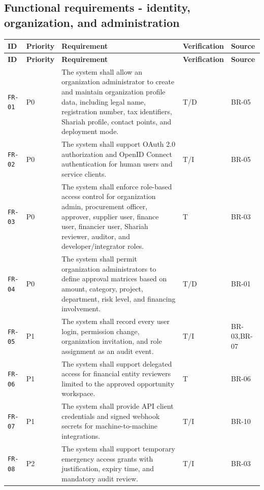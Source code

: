 \documentclass[11pt,a4paper]{article}
\begin{document}
\subsection{Functional requirements - identity, organization, and administration}\label{sec:fr-identity}
\begin{footnotesize}
\begin{longtable}{@{}p{}p{}p{}p{}p{}@{}}
\rowcolor{gray!18}\textbf{ID} & \textbf{Priority} & \textbf{Requirement} & \textbf{Verification} & \textbf{Source} \\ \hline
\endfirsthead
\rowcolor{gray!18}\textbf{ID} & \textbf{Priority} & \textbf{Requirement} & \textbf{Verification} & \textbf{Source} \\ \hline
\endhead
\texttt{FR-01} & P0 & The system shall allow an organization administrator to create and maintain organization profile data, including legal name, registration number, tax identifiers, Shariah profile, contact points, and deployment mode. & T/D & BR-05 \\ \hline
\texttt{FR-02} & P0 & The system shall support OAuth 2.0 authorization and OpenID Connect authentication for human users and service clients. & T/I & BR-05 \\ \hline
\texttt{FR-03} & P0 & The system shall enforce role-based access control for organization admin, procurement officer, approver, supplier user, finance user, financier user, Shariah reviewer, auditor, and developer/integrator roles. & T & BR-03 \\ \hline
\texttt{FR-04} & P0 & The system shall permit organization administrators to define approval matrices based on amount, category, project, department, risk level, and financing involvement. & T/D & BR-01 \\ \hline
\texttt{FR-05} & P1 & The system shall record every user login, permission change, organization invitation, and role assignment as an audit event. & T/I & BR-03,BR-07 \\ \hline
\texttt{FR-06} & P1 & The system shall support delegated access for financial entity reviewers limited to the approved opportunity workspace. & T & BR-06 \\ \hline
\texttt{FR-07} & P1 & The system shall provide API client credentials and signed webhook secrets for machine-to-machine integrations. & T/I & BR-10 \\ \hline
\texttt{FR-08} & P2 & The system shall support temporary emergency access grants with justification, expiry time, and mandatory audit review. & T/I & BR-03 \\ \hline
\end{longtable}
\end{footnotesize}
\end{document}
